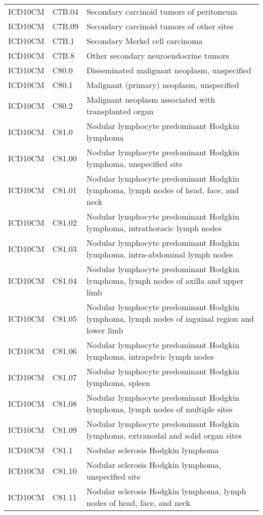\begin{table}[ht]
\begin{tabular}{lll}
  ICD10CM & C7B.04 & Secondary carcinoid tumors of peritoneum \\ 
  ICD10CM & C7B.09 & Secondary carcinoid tumors of other sites \\ 
  ICD10CM & C7B.1 & Secondary Merkel cell carcinoma \\ 
  ICD10CM & C7B.8 & Other secondary neuroendocrine tumors \\ 
  ICD10CM & C80.0 & Disseminated malignant neoplasm, unspecified \\ 
  ICD10CM & C80.1 & Malignant (primary) neoplasm, unspecified \\ 
  ICD10CM & C80.2 & Malignant neoplasm associated with transplanted organ \\ 
  ICD10CM & C81.0 & Nodular lymphocyte predominant Hodgkin lymphoma \\ 
  ICD10CM & C81.00 & Nodular lymphocyte predominant Hodgkin lymphoma, unspecified site \\ 
  ICD10CM & C81.01 & Nodular lymphocyte predominant Hodgkin lymphoma, lymph nodes of head, face, and neck \\ 
  ICD10CM & C81.02 & Nodular lymphocyte predominant Hodgkin lymphoma, intrathoracic lymph nodes \\ 
  ICD10CM & C81.03 & Nodular lymphocyte predominant Hodgkin lymphoma, intra-abdominal lymph nodes \\ 
  ICD10CM & C81.04 & Nodular lymphocyte predominant Hodgkin lymphoma, lymph nodes of axilla and upper limb \\ 
  ICD10CM & C81.05 & Nodular lymphocyte predominant Hodgkin lymphoma, lymph nodes of inguinal region and lower limb \\ 
  ICD10CM & C81.06 & Nodular lymphocyte predominant Hodgkin lymphoma, intrapelvic lymph nodes \\ 
  ICD10CM & C81.07 & Nodular lymphocyte predominant Hodgkin lymphoma, spleen \\ 
  ICD10CM & C81.08 & Nodular lymphocyte predominant Hodgkin lymphoma, lymph nodes of multiple sites \\ 
  ICD10CM & C81.09 & Nodular lymphocyte predominant Hodgkin lymphoma, extranodal and solid organ sites \\ 
  ICD10CM & C81.1 & Nodular sclerosis Hodgkin lymphoma \\ 
  ICD10CM & C81.10 & Nodular sclerosis Hodgkin lymphoma, unspecified site \\ 
  ICD10CM & C81.11 & Nodular sclerosis Hodgkin lymphoma, lymph nodes of head, face, and neck \\ 

\end{tabular}
\end{table}
